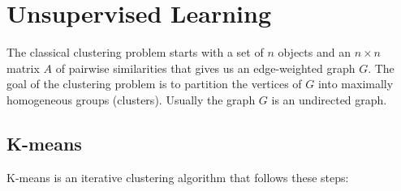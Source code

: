 \section{Unsupervised Learning}
The classical clustering problem starts with a set of $n$ objects and an $n \times n$ matrix $A$ of pairwise similarities that gives us an edge-weighted graph $G$. The goal of the clustering problem is to partition the vertices of $G$ into maximally homogeneous groups (clusters). Usually the graph $G$ is an undirected graph.

\subsection{K-means}
K-means is an iterative clustering algorithm that follows these steps:
